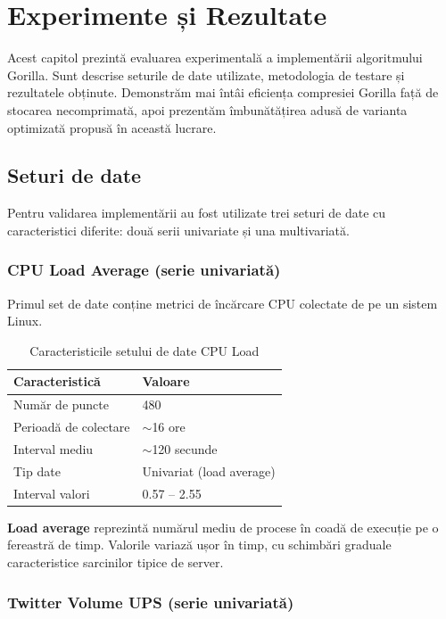 \chapter{Experimente și Rezultate}

Acest capitol prezintă evaluarea experimentală a implementării algoritmului Gorilla. Sunt descrise seturile de date utilizate, metodologia de testare și rezultatele obținute. Demonstrăm mai întâi eficiența compresiei Gorilla față de stocarea necomprimată, apoi prezentăm îmbunătățirea adusă de varianta optimizată propusă în această lucrare.

\section{Seturi de date}

Pentru validarea implementării au fost utilizate trei seturi de date cu caracteristici diferite: două serii univariate și una multivariată.

\subsection{CPU Load Average (serie univariată)}

Primul set de date conține metrici de încărcare CPU colectate de pe un sistem Linux.

\begin{table}[h]
\centering
\begin{tabular}{@{}ll@{}}
\toprule
\textbf{Caracteristică} & \textbf{Valoare} \\
\midrule
Număr de puncte & 480 \\
Perioadă de colectare & $\sim$16 ore \\
Interval mediu & $\sim$120 secunde \\
Tip date & Univariat (load average) \\
Interval valori & 0.57 -- 2.55 \\
\bottomrule
\end{tabular}
\caption{Caracteristicile setului de date CPU Load}
\label{tab:cpu-dataset}
\end{table}

\textbf{Load average} reprezintă numărul mediu de procese în coadă de execuție pe o fereastră de timp. Valorile variază ușor în timp, cu schimbări graduale caracteristice sarcinilor tipice de server.

\subsection{Twitter Volume UPS (serie univariată)}

